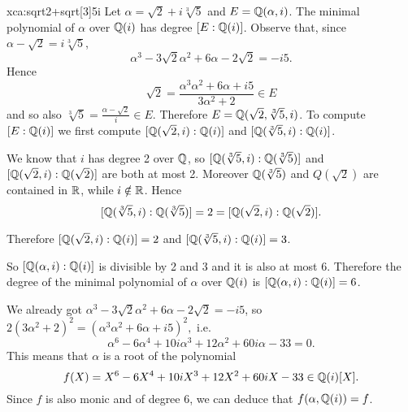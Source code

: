\begin{sol}{xca:sqrt{2}+sqrt[3]{5}i}
    Let $\alpha=\sqrt{2}+i\sqrt[3]{5}$ and $E=\mathbb{Q}(\alpha,i)$. 
    The minimal polynomial of $\alpha$ over $\mathbb{Q}(i)$ has
    degree $[E:\mathbb{Q}(i)]$.
    Observe that, since $\alpha-\sqrt{2}=i\sqrt[3]{5}$,
    \[
    \alpha^3-3\sqrt{2}\alpha^2+6\alpha-2\sqrt{2}=-i5.
    \]
    Hence 
    \[
    \sqrt{2}=\frac{\alpha^3\alpha^2+6\alpha+i5}{3\alpha^2+2}\in E
    \]
    and so also $\sqrt[3]{5}=\frac{\alpha-\sqrt{2}}{i}\in E$. 
    Therefore $E=\mathbb{Q}(\sqrt{2},\sqrt[3]{5},i)$.
    To compute $[E:\mathbb{Q}(i)]$ we first compute $[\mathbb{Q}(\sqrt{2},i):\mathbb{Q}(i)]$
    and  $[\mathbb{Q}(\sqrt[3]{5},i):\mathbb{Q}(i)]$.
    
    We know that $i$ has degree 2 over $\mathbb{Q}$,
so $[\mathbb{Q}(\sqrt[3]{5},i):\mathbb{Q}(\sqrt[3]{5})]$ and 
$[\mathbb{Q}(\sqrt{2},i):\mathbb{Q}(\sqrt{2})]$ are both at most 2.
Moreover $\mathbb{Q}(\sqrt[3]{5})$ and $Q(\sqrt{2})$ are contained in $\mathbb{R}$,
while $i\notin\mathbb{R}$.
Hence
\[
[\mathbb{Q}(\sqrt[3]{5},i):\mathbb{Q}(\sqrt[3]{5})]=2=[\mathbb{Q}(\sqrt{2},i):\mathbb{Q}(\sqrt{2})].
\]
\begin{center}
    \end{center}
Therefore $[\mathbb{Q}(\sqrt{2},i):\mathbb{Q}(i)]=2$
    and  $[\mathbb{Q}(\sqrt[3]{5},i):\mathbb{Q}(i)]=3$.
    \begin{center}
    \end{center}
So $[\mathbb{Q}(\alpha, i):\mathbb{Q}(i)]$ is divisible by 2 and 3 and it is also at most 6.
Therefore the degree of the minimal polynomial
of $\alpha$ over $\mathbb{Q}(i)$ is $[\mathbb{Q}(\alpha,i):\mathbb{Q}(i)]=6$.

We already got $\alpha^3-3\sqrt{2}\alpha^2+6\alpha-2\sqrt{2}=-i5$, 
so $2(3\alpha^2+2)^2=(\alpha^3\alpha^2+6\alpha+i5)^2,
$
i.e. 
\[
\alpha^6-6\alpha^4+10i\alpha^3+12\alpha^2+60i\alpha-33=0.
\]
This means that $\alpha$ is a root of the polynomial
\[
f(X)=X^6-6X^4+10iX^3+12X^2+60iX-33\in\mathbb{Q}(i)[X].
\]
Since $f$ is also monic and of degree 6, we can deduce that 
$f(\alpha,\mathbb{Q}(i))=f$.
\end{sol}

